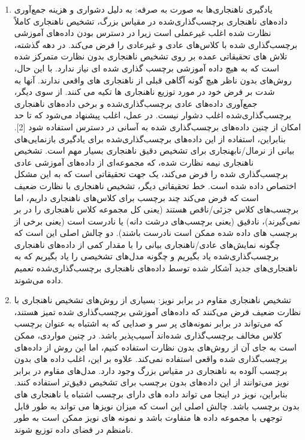 \documentclass[12pt,a4paper]{report}
\theoremstyle{definition}
\theoremstyle{definition}
\begin{document}
\begin{enumerate}
\item {
	یادگیری ناهنجاری‌ها به صورت به صرفه:
به دلیل دشواری و هزینه جمع‌آوری داده‌های ناهنجاری برچسب‌گذاری‌شده در مقیاس بزرگ، تشخیص ناهنجاری کاملاً نظارت شده اغلب غیرعملی است زیرا در دسترس بودن داده‌های آموزشی برچسب‌گذاری شده با کلاس‌های عادی و غیرعادی را فرض می‌کند. در دهه گذشته، تلاش های تحقیقاتی عمده بر روی تشخیص ناهنجاری بدون نظارت متمرکز شده است که به هیچ داده آموزشی برچسب گذاری شده ای نیاز ندارد. با این حال، روش‌های بدون ناظر هیچ گونه آگاهی قبلی از ناهنجاری های واقعی ندارند. آنها به شدت بر فرض خود در مورد توزیع ناهنجاری ها تکیه می کنند. از سوی دیگر، جمع‌آوری داده‌های عادی برچسب‌گذاری‌شده و برخی داده‌های ناهنجاری برچسب‌گذاری‌شده اغلب دشوار نیست. در عمل، اغلب پیشنهاد می‌شود که تا حد امکان از چنین داده‌های برچسب‌گذاری شده به آسانی در دسترس استفاده شود [2]. بنابراین، استفاده از این داده‌های برچسب‌گذاری‌شده برای یادگیری بازنمایی‌های بیانی از نرمال/نابهنجاری برای تشخیص دقیق ناهنجاری بسیار مهم است. تشخیص ناهنجاری نیمه نظارت شده، که مجموعه‌ای از داده‌های آموزشی عادی برچسب‌گذاری شده را فرض می‌کند، یک جهت تحقیقاتی است که به این مشکل اختصاص داده شده است. خط تحقیقاتی دیگر، تشخیص ناهنجاری با نظارت ضعیف است که فرض می‌کند چند برچسب برای کلاس‌های ناهنجاری داریم، اما برچسب‌های کلاس جزئی/ناقص هستند (یعنی کل مجموعه کلاس ناهنجاری را در بر نمی‌گیرند)، نادقیق (یعنی برچسب‌های درشت دانه) یا نادرست است (یعنی برخی از برچسب های داده شده ممکن است نادرست باشند). دو چالش اصلی این است که چگونه نمایش‌های عادی/ناهنجاری بیانی را با مقدار کمی از داده‌های ناهنجاری برچسب‌گذاری‌شده یاد بگیریم و چگونه مدل‌های تشخیصی را یاد بگیریم که به ناهنجاری‌های جدید آشکار شده توسط داده‌های ناهنجاری برچسب‌گذاری‌شده تعمیم داده می‌شوند.

}

\item{
تشخیص ناهنجاری مقاوم در برابر نویز:
بسیاری از روش‌های تشخیص ناهنجاری با نظارت ضعیف فرض می‌کنند که داده‌های آموزشی برچسب‌گذاری شده تمیز هستند، که می‌تواند در برابر نمونه‌های پر سر و صدایی که به اشتباه به عنوان برچسب کلاس مخالف برچسب‌گذاری شده‌اند آسیب‌پذیر باشد. در چنین مواردی، ممکن است به جای آن از روش‌های بدون نظارت استفاده کنیم، اما این روش از داده‌های برچسب‌گذاری شده واقعی استفاده نمی‌کند. علاوه بر این، اغلب داده های بدون برچسب آلوده به ناهنجاری در مقیاس بزرگ وجود دارد. مدل‌های مقاوم در برابر نویز می‌توانند از این داده‌های بدون برچسب برای تشخیص دقیق‌تر استفاده کنند. بنابراین، نویز در اینجا می تواند داده های دارای برچسب اشتباه یا ناهنجاری های بدون برچسب باشد. چالش اصلی این است که میزان نویزها می تواند به طور قابل توجهی با مجموعه داده ها متفاوت باشد و نمونه های نویز ممکن است به طور نامنظم در فضای داده توزیع شوند.

}
\end{enumerate}
\end{document}

